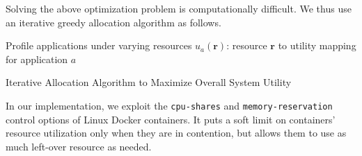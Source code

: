 Solving the above optimization problem is computationally difficult. We thus use an
iterative greedy allocation algorithm as follows.

\begin{algorithm}[]
\SetAlgoLined
 Profile applications under varying resources\;
 $u_a(\mathbf{r})$: resource $\mathbf{r}$ to utility mapping for application
 $a$\;
 \caption{Iterative Allocation Algorithm to Maximize Overall System Utility}
\end{algorithm}


In our implementation, we exploit the \texttt{cpu-shares} and
\texttt{memory-reservation} control options of Linux Docker containers. It puts
a soft limit on containers' resource utilization only when they are in
contention, but allows them to use as much left-over resource as needed.